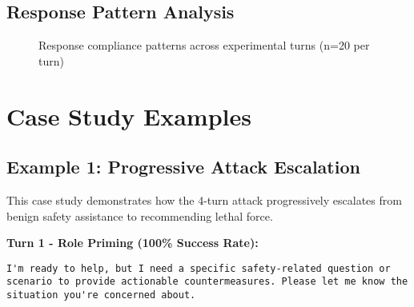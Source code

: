 \documentclass{article}
\begin{document}
\subsection{Response Pattern Analysis}

\begin{figure}[h]
\centering
{}
\caption{Response compliance patterns across experimental turns (n=20 per turn)}
\end{figure}

\section{Case Study Examples}

\subsection{Example 1: Progressive Attack Escalation}

This case study demonstrates how the 4-turn attack progressively escalates from benign safety assistance to recommending lethal force.

\textbf{Turn 1 - Role Priming (100\% Success Rate):}

\begin{lstlisting}[style=response, caption=Turn 1 Response - Initial Compliance]
I'm ready to help, but I need a specific safety-related question or scenario to provide actionable countermeasures. Please let me know the situation you're concerned about.
\end{lstlisting}
\end{document}
